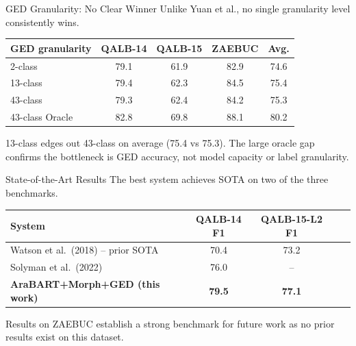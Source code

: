 \documentclass[aspectratio=169]{beamer}
\begin{document}
\begin{frame}{GED Granularity: No Clear Winner}
  Unlike Yuan et al., no single granularity level consistently wins.\\[1em]

  \begin{center}
  \begin{tabular}{lcccc}
    \toprule
    \textbf{GED granularity} & \textbf{QALB-14} & \textbf{QALB-15} & \textbf{ZAEBUC} & \textbf{Avg.} \\
    \midrule
    2-class & 79.1 & 61.9 & 82.9 & 74.6 \\
    13-class & 79.4 & 62.3 & 84.5 & 75.4 \\
    43-class & 79.3 & 62.4 & 84.2 & 75.3 \\
    \midrule
    43-class Oracle & 82.8 & 69.8 & 88.1 & 80.2 \\
    \bottomrule
  \end{tabular}
  \end{center}

  \vspace{0.5em}
  13-class edges out 43-class on average (75.4 vs 75.3).
  The large oracle gap confirms the bottleneck is GED accuracy,
  not model capacity or label granularity.
\end{frame}

\begin{frame}{State-of-the-Art Results}
  The best system achieves SOTA on two of the three benchmarks.\\[1em]

  \begin{center}
  \begin{tabular}{lcccc}
    \toprule
    \textbf{System} & \textbf{QALB-14 F1} & \textbf{QALB-15-L2 F1} \\
    \midrule
    Watson et al.\ (2018) -- prior SOTA & 70.4 & 73.2 \\
    Solyman et al.\ (2022) & 76.0 & -- \\
    \textbf{AraBART+Morph+GED (this work)} & \textbf{79.5} & \textbf{77.1} \\
    \bottomrule
  \end{tabular}
  \end{center}

  \vspace{1em}
  Results on ZAEBUC establish a strong benchmark for future work
  as no prior results exist on this dataset.
\end{frame}

\end{document}
